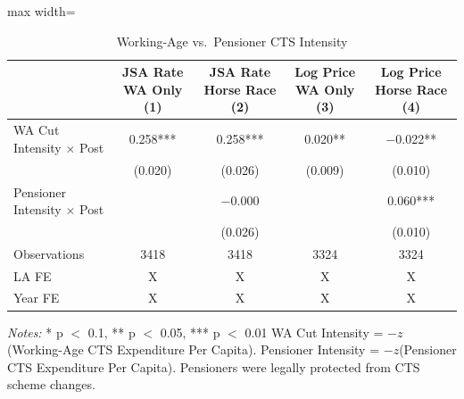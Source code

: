 \begin{table}
\centering
\caption{Working-Age vs.~Pensioner CTS Intensity}
\centering
\begin{adjustbox}{max width=\textwidth}
\begin{tabular}[t]{lcccc}
\toprule
  & JSA Rate
WA Only
(1) & JSA Rate
Horse Race
(2) & Log Price
WA Only
(3) & Log Price
Horse Race
(4)\\
\midrule
WA Cut Intensity $\times$ Post & \num{0.258}*** & \num{0.258}*** & \num{0.020}** & \num{-0.022}**\\
 & (\num{0.020}) & (\num{0.026}) & (\num{0.009}) & (\num{0.010})\\
Pensioner Intensity $\times$ Post &  & \num{-0.000} &  & \num{0.060}***\\
 &  & (\num{0.026}) &  & (\num{0.010})\\
\midrule
Observations & \num{3418} & \num{3418} & \num{3324} & \num{3324}\\
LA FE & X & X & X & X\\
Year FE & X & X & X & X\\
\bottomrule

\end{tabular}
\end{adjustbox}
\begin{flushleft}
\footnotesize
\textit{Notes:} * p $<$ 0.1, ** p $<$ 0.05, *** p $<$ 0.01 WA Cut Intensity = $-z$(Working-Age CTS Expenditure Per Capita). Pensioner Intensity = $-z$(Pensioner CTS Expenditure Per Capita). Pensioners were legally protected from CTS scheme changes.
\end{flushleft}
\end{table}

